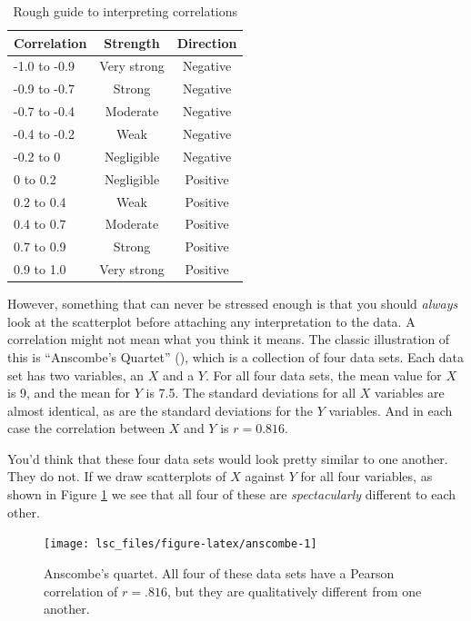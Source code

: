 \documentclass[
  11pt,
  a4paper,
  twoside,symmetric,openright]{book}
\theoremstyle{break}
\theoremstyle{break}
\begin{document}
\begin{table}

\caption{\label{tab:interpretingcorrelations}Rough guide to interpreting correlations}
\centering
\begin{tabular}[t]{lcc}
\toprule
Correlation & Strength & Direction\\
\midrule
-1.0 to -0.9 & Very strong & Negative\\
-0.9 to -0.7 & Strong & Negative\\
-0.7 to -0.4 & Moderate & Negative\\
-0.4 to -0.2 & Weak & Negative\\
-0.2 to 0 & Negligible & Negative\\
0 to 0.2 & Negligible & Positive\\
0.2 to 0.4 & Weak & Positive\\
0.4 to 0.7 & Moderate & Positive\\
0.7 to 0.9 & Strong & Positive\\
0.9 to 1.0 & Very strong & Positive\\
\bottomrule
\end{tabular}
\end{table}

However, something that can never be stressed enough is that you should \emph{always} look at the scatterplot before attaching any interpretation to the data. A correlation might not mean what you think it means. The classic illustration of this is ``Anscombe's Quartet'' (), which is a collection of four data sets. Each data set has two variables, an \(X\) and a \(Y\). For all four data sets, the mean value for \(X\) is 9, and the mean for \(Y\) is 7.5. The standard deviations for all \(X\) variables are almost identical, as are the standard deviations for the \(Y\) variables. And in each case the correlation between \(X\) and \(Y\) is \(r = 0.816\).

You'd think that these four data sets would look pretty similar to one another. They do not. If we draw scatterplots of \(X\) against \(Y\) for all four variables, as shown in Figure \ref{fig:anscombe} we see that all four of these are \emph{spectacularly} different to each other.

\begin{figure}

{\centering \texttt{[image: lsc\_files/figure-latex/anscombe-1]} 

}

\caption{Anscombe's quartet. All four of these data sets have a Pearson correlation of $r = .816$, but they are qualitatively different from one another.}\label{fig:anscombe}
\end{figure}
\end{document}
